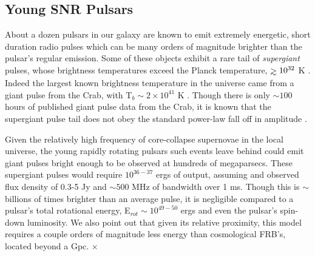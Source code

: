 \documentclass[useAMS,usenatbib]{mn2e}
\def\gtrsim{\mathrel{\hbox{\rlap{\hbox{\lower4pt\hbox{$\sim$}}}\hbox{$>$}}}}
\begin{document}
\subsection{Young SNR Pulsars}

About a dozen pulsars in our galaxy are known to emit extremely energetic,
short duration radio pulses which can be many orders of magnitude 
brighter than the pulsar's regular emission. Some of these objects exhibit 
a rare tail of \textit{supergiant} pulses, whose brightness temperatures 
exceed the Planck temperature, $\gtrsim10^{32}$ K \citep{2004ApJ...612..375C}.
Indeed the largest
known brightness temperature in the universe came from a giant pulse from the Crab,
 with T$_b\sim2\times10^{41}$ K \citep{2014ApJ...792..135T}. Though there
is only $\sim100$ hours of published giant pulse data from the Crab, it is known
that the supergiant pulse tail does not obey the standard power-law fall off
in amplitude \citep{2012ApJ...760...64M}.

Given the relatively high frequency of core-collapse supernovae 
in the local universe, the young 
rapidly rotating pulsars such events leave behind could emit giant 
pulses bright enough to be observed at hundreds of megaparsecs. 
These supergiant pulses would require $10^{36 - 37}$ ergs of output,
assuming and observed flux density of 0.3-5 Jy and $\sim500$ 
MHz of bandwidth over 1 ms. Though this is $\sim$ billions of times
brighter than an average pulse, it is negligible compared to a 
pulsar's total rotational energy, E$_{rot} \sim 10^{49-50}$ ergs and
even the pulsar's spin-down luminosity. We
also point out that given its relative proximity, this model requires
a couple orders of magnitude less energy than cosmological FRB's,
located beyond a Gpc. $\times$

\end{document}

